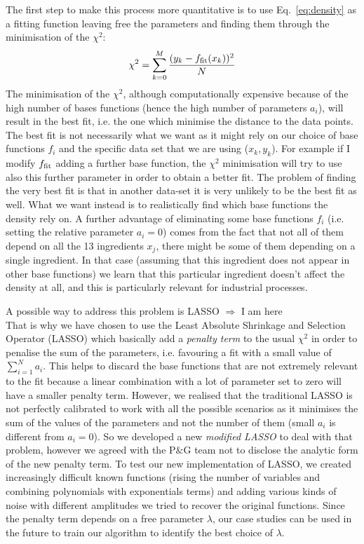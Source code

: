 \documentclass[letterpaper]{article}
\newcommand{\peg}{P$\&$G }
\begin{document}
The first step to make this process more quantitative is to use Eq.~\ref{eq:density} as a fitting function leaving free the parameters and finding them through the minimisation of the $\chi^2$:
\begin{equation}
\label{eq:chisquared}
\chi^2=\sum_{k=0}^M\frac{(y_k - f_{\rm{fit}}(x_k))^2}{N}
\end{equation}
The minimisation of the $\chi^2$, although computationally expensive because of the high number of bases functions (hence the high number of parameters $a_i$), will result in the best fit, i.e. the one which minimise the distance to the data points. The best fit is not necessarily what we want as it might rely on our choice of base functions $f_i$ and the specific data set that we are using ($x_k,y_k$). For example if I modify $f_{\rm{fit}}$ adding a further base function, the $\chi^2$ minimisation will try to use also this further parameter in order to obtain a better fit. The problem of finding the very best fit is that in another data-set it is very unlikely to be the best fit as well.  What we want instead is to realistically find which base functions the density rely on. A further advantage of eliminating some base functions $f_i$ (i.e. setting the relative parameter $a_i=0$) comes from the fact that not all of them depend on all the 13 ingredients $x_j$, there might be some of them depending on a single ingredient. In that case (assuming that this ingredient does not appear in other base functions) we learn that this particular ingredient doesn't affect the density at all, and this is particularly relevant for industrial processes.

A possible way to address this problem is   {\color{red}\huge{LASSO $\Rightarrow$ I am here}}  \\


That is why we have chosen to use the Least Absolute Shrinkage and Selection Operator (LASSO) which basically add a \textit{penalty term} to the usual $\chi^2$ in order to penalise the sum of the parameters, i.e. favouring a fit with a small value of $\sum_{i=1}^N a_i$. This helps to discard the base functions that are not extremely relevant to the fit because a linear combination with a lot of parameter set to zero will have a smaller penalty term. However, we realised that the traditional LASSO is not perfectly calibrated to work with all the possible scenarios as it minimises the sum of the values of the parameters and not the number of them (small $a_i$ is different from $a_i=0$). So we developed a new \textit{modified LASSO} to deal with that problem, however we agreed with the \peg team not to disclose the analytic form of the new penalty term. To test our new implementation of LASSO, we created increasingly difficult known functions (rising the number of variables and combining polynomials with exponentials terms) and adding various kinds of noise with different amplitudes we tried to recover the original functions. Since the penalty term depends on a free parameter $\lambda$, our case studies can be used in the future to train our algorithm to identify the best choice of $\lambda$.
\end{document}
